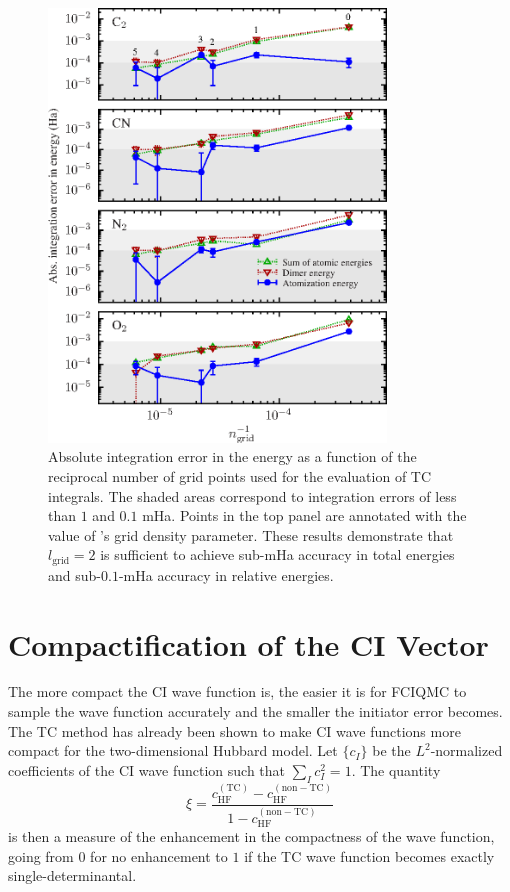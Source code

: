 \begin{figure}[htbp]
    \centering
    \includegraphics[width=0.8\textwidth]{figures/optimisation/Fig/griderr-dimers}
    \caption{Absolute integration error in the energy as a function of the reciprocal number of grid points used for the evaluation of TC integrals. The shaded areas correspond to integration errors of less than $1$ and $0.1$ mHa. Points in the top panel are annotated with the value of \pyscf's grid density parameter. These results demonstrate that $l_\mathrm{grid}=2$ is sufficient to achieve sub-mHa accuracy in total energies and sub-$0.1$-mHa accuracy in relative energies.}
    \label{fig:griderr-dimers}
\end{figure}


\section{Compactification of the CI Vector}
The more compact the CI wave function is, the easier it is for FCIQMC to sample the wave function accurately and the smaller the initiator error becomes. The TC method has already been shown to make CI wave functions more compact for the two-dimensional Hubbard model. Let $\{c_I\}$ be the $L^2$-normalized coefficients of the CI wave
function such that $\sum_I c_I^2=1$.
%
The quantity
%
\begin{equation}
  \label{eq:xi_compactness}
  \xi = \frac { c^\mathrm{(TC)}_\mathrm{HF} - c^\mathrm{(non-TC)}_\mathrm{HF} }{ 1 - c^\mathrm{(non-TC)}_\mathrm{HF} }
\end{equation}
%
is then a measure of the enhancement in the compactness of the wave
function, going from $0$ for no enhancement to $1$ if the TC wave
function becomes exactly single-determinantal.

